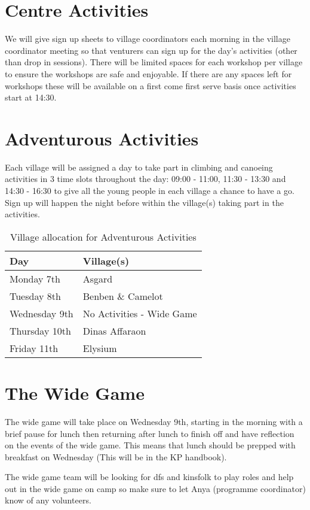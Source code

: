 \documentclass[a4paper, 11pt]{report}
\begin{document}
\section{Centre Activities}
We will give sign up sheets to village coordinators each morning in the village coordinator meeting so that venturers can sign up for the day's activities (other than drop in sessions). There will be limited spaces for each workshop per village to ensure the workshops are safe and enjoyable. If there are any spaces left for workshops these will be available on a first come first serve basis once activities start at 14:30.

\section{Adventurous Activities}
Each village will be assigned a day to take part in climbing and canoeing activities in 3 time slots throughout the day: 09:00 - 11:00, 11:30 - 13:30 and 14:30 - 16:30 to give all the young people in each village a chance to have a go. Sign up will happen the night before within the village(s) taking part in the activities. 
\begin{table}[H]
    \centering
    \begin{tabular}{ll}
    \textbf{Day} & \textbf{Village(s)}\\
    \hline
    Monday 7th & Asgard \\
    \hline
    Tuesday 8th & Benben \& Camelot \\
    \hline
    Wednesday 9th & No Activities - Wide Game \\
    \hline
    Thursday 10th & Dinas Affaraon \\
    \hline
    Friday 11th & Elysium \\
    \hline
    \end{tabular}
    \caption{Village allocation for Adventurous Activities}
\end{table}

\section{The Wide Game}
The wide game will take place on Wednesday 9th, starting in the morning with a brief pause for lunch then returning after lunch to finish off and have reflection on the events of the wide game. This means that lunch should be prepped with breakfast on Wednesday (This will be in the KP handbook).\nl

The wide game team will be looking for dfs and kinsfolk to play roles and help out in the wide game on camp so make sure to let Anya (programme coordinator) know of any volunteers. 
\end{document}
